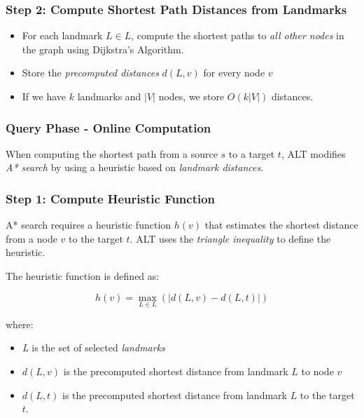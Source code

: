 				\subsubsection{Step 2: Compute Shortest Path Distances from Landmarks}
				\begin{itemize}
					\item For each landmark $ L \in \textit{L} $, compute the shortest paths to \textit{all other nodes} in the graph using Dijkstra’s Algorithm.
					\item Store the \textit{precomputed distances} $ d(L, v) $ for every node $ v $
					\item If we have $ k $ landmarks and $ |V| $ nodes, we store $ O(k |V|) $ distances.
				\end{itemize}
				
				\subsubsection{Query Phase - Online Computation}
				When computing the shortest path from a source $ s $ to a target $ t $, ALT modifies \textit{A* search} by using a heuristic based on \textit{landmark distances}.
				
				\subsubsection{Step 1: Compute Heuristic Function}
				A* search requires a heuristic function $ h(v) $ that estimates the shortest distance from a node $ v $ to the target $ t $. ALT uses the \textit{triangle inequality} to define the heuristic.
				
					The heuristic function is defined as:
					
					\begin{equation}
						h(v) = \max_{L \in \textit{L}} \left( \left| d(L, v) - d(L, t) \right| \right)
					\end{equation}
					
					where:
					\begin{itemize}
						\item \textit{L}  is the set of selected \textit{landmarks}
						
						\item $ d(L, v) $ is the precomputed shortest distance from landmark $ L $ to node $ v $
						
						\item $ d(L, t) $ is the precomputed shortest distance from landmark $ L $ to the target $ t $.
					\end{itemize}
				
